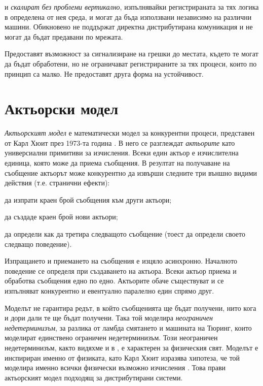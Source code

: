  и  \emph{скалират без проблеми вертикално}, изпълнявайки регистрираната за тях логика в определена от нея среда, и могат да бъда използвани независимо на различни машини. Обикновено не поддържат директна дистрибутирана комуникация и не могат да бъдат предавани по мрежата.

Предоставят възможност за сигнализиране на грешки до местата, където те могат да бъдат обработени, но не ограничават регистрираните за тях процеси, които по принцип са малко. Не предоставят друга форма на устойчивост.

\section{Актьорски модел}
\label{sec:actor-model}

\emph{Актьорският модел} е математически модел за конкурентни процеси, представен от Карл Хюит през 1973-та година \cite{hewitt1973ActorAIO}. В него се разглеждат \emph{актьорите} като универсиални примитиви за изчисления. Всеки един актьор е изчислителна единица, която може да приема съобщения. В резултат на получаване на съобщение актьорът може конкурентно да извърши следните три външно видими действия (т.е. странични ефекти):

\begin{itemize*}
  \item да изпрати краен брой съобщения към други актьори;
  \item да създаде краен брой нови актьори;
  \item да определи как да третира следващото съобщение (тоест да определи своето следващо поведение).
\end{itemize*}

Изпращането и приемането на съобщения е изцяло асинхронно. Началното поведение се определя при създаването на актьора. Всеки актьор приема и обработва съобщения едно по едно. Актьорите обаче съществуват и се изпълняват конкурентно и евентуално паралелно един спрямо друг.

Моделът не гарантира редът, в който съобщенията ще бъдат получени, нито кога и дори дали те ще бъдат получени. Така той моделира \emph{неограничен недетерминизъм}, за разлика от ламбда смятането и машината на Тюринг, които моделират единствено ограничен недетерминизъм. Този неограничен недетерминизъм, както видяхме и в , е характерен за физическия свят. Моделът е инспириран именно от физиката, като Карл Хюит изразява хипотеза, че той моделира именно всички физически възможно изчисления \cite{hewitt2010ActorModel}. Това прави актьорският модел подходящ за дистрибутирани системи.


